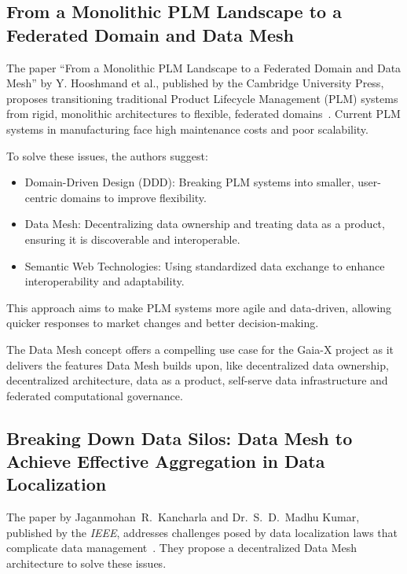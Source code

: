 \subsection[From a Monolithic PLM Landscape to Data Mesh]{From a Monolithic PLM Landscape to a Federated Domain and Data Mesh}\label{subsec:from-a-monolithic-plm-landscape-to-a-federated-domain-and-data-mesh}

The paper ``From a Monolithic PLM Landscape to a Federated Domain and Data Mesh'' by Y. Hooshmand et al., published by the Cambridge University Press, proposes transitioning traditional Product Lifecycle Management (PLM) systems from rigid, monolithic architectures to flexible, federated domains~\cite{from_monolithic_plm_to_federated}.
Current PLM systems in manufacturing face high maintenance costs and poor scalability.

To solve these issues, the authors suggest:
\begin{itemize}
    \item Domain-Driven Design (DDD): Breaking PLM systems into smaller, user-centric domains to improve flexibility.
    \item Data Mesh: Decentralizing data ownership and treating data as a product, ensuring it is discoverable and interoperable.
    \item Semantic Web Technologies: Using standardized data exchange to enhance interoperability and adaptability.
\end{itemize}

This approach aims to make PLM systems more agile and data-driven, allowing quicker responses to market changes and better decision-making.

The Data Mesh concept offers a compelling use case for the Gaia-X project as it delivers the features Data Mesh builds upon, like decentralized data ownership, decentralized architecture, data as a product, self-serve data infrastructure and federated computational governance.

\subsection[Breaking Down Data Silos]{Breaking Down Data Silos: Data Mesh to Achieve Effective Aggregation in Data Localization}\label{subsec:breaking-down-data-silos:-data-mesh-to-achieve-effective-aggregation-in-data-localization}

The paper by Jaganmohan~R.~Kancharla and Dr.~S.~D.~Madhu Kumar, published by the \textit{IEEE}, addresses challenges posed by data localization laws that complicate data management~\cite{breaking_down_data_silos}.
They propose a decentralized Data Mesh architecture to solve these issues.

